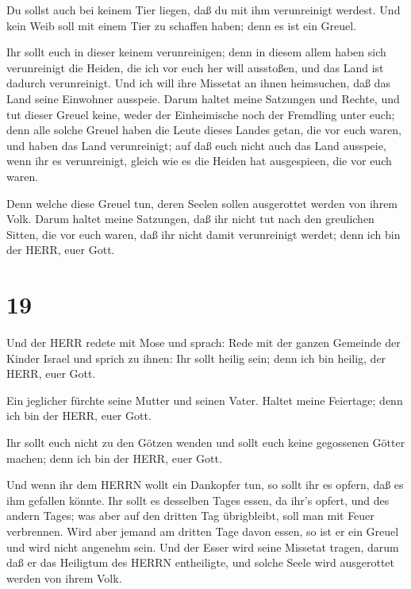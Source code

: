  Du sollst auch bei keinem Tier liegen, daß du mit ihm
verunreinigt werdest. Und kein Weib soll mit einem Tier zu schaffen
haben; denn es ist ein Greuel.

 Ihr sollt euch in dieser keinem verunreinigen; denn in
diesem allem haben sich verunreinigt die Heiden, die ich vor euch her
will ausstoßen,  und das Land ist dadurch verunreinigt. Und
ich will ihre Missetat an ihnen heimsuchen, daß das Land seine Einwohner
ausspeie.  Darum haltet meine Satzungen und Rechte, und tut
dieser Greuel keine, weder der Einheimische noch der Fremdling unter
euch;  denn alle solche Greuel haben die Leute dieses
Landes getan, die vor euch waren, und haben das Land verunreinigt;
 auf daß euch nicht auch das Land ausspeie, wenn ihr es
verunreinigt, gleich wie es die Heiden hat ausgespieen, die vor euch
waren.

 Denn welche diese Greuel tun, deren Seelen sollen
ausgerottet werden von ihrem Volk.  Darum haltet meine
Satzungen, daß ihr nicht tut nach den greulichen Sitten, die vor euch
waren, daß ihr nicht damit verunreinigt werdet; denn ich bin der HERR,
euer Gott.

\hypertarget{section-18}{%
\section{19}\label{section-18}}

 Und der HERR redete mit Mose und sprach:  Rede
mit der ganzen Gemeinde der Kinder Israel und sprich zu ihnen: Ihr sollt
heilig sein; denn ich bin heilig, der HERR, euer Gott.

 Ein jeglicher fürchte seine Mutter und seinen Vater. Haltet
meine Feiertage; denn ich bin der HERR, euer Gott.

 Ihr sollt euch nicht zu den Götzen wenden und sollt euch
keine gegossenen Götter machen; denn ich bin der HERR, euer Gott.

 Und wenn ihr dem HERRN wollt ein Dankopfer tun, so sollt
ihr es opfern, daß es ihm gefallen könnte.  Ihr sollt es
desselben Tages essen, da ihr's opfert, und des andern Tages; was aber
auf den dritten Tag übrigbleibt, soll man mit Feuer verbrennen.
 Wird aber jemand am dritten Tage davon essen, so ist er ein
Greuel und wird nicht angenehm sein.  Und der Esser wird
seine Missetat tragen, darum daß er das Heiligtum des HERRN entheiligte,
und solche Seele wird ausgerottet werden von ihrem Volk.

